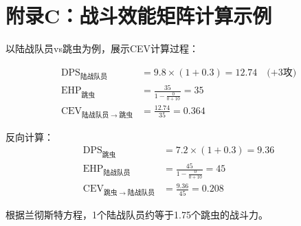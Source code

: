 \documentclass[a4paper,12pt]{article}
\begin{document}
\section{附录C：战斗效能矩阵计算示例}

以陆战队员vs跳虫为例，展示CEV计算过程：

\begin{align}
\text{DPS}_{陆战队员} &= 9.8 \times (1 + 0.3) = 12.74 \quad \text{(+3攻)} \\
\text{EHP}_{跳虫} &= \frac{35}{1 - \frac{0}{0 + 10}} = 35 \\
\text{CEV}_{陆战队员 \rightarrow 跳虫} &= \frac{12.74}{35} = 0.364
\end{align}

反向计算：
\begin{align}
\text{DPS}_{跳虫} &= 7.2 \times (1 + 0.3) = 9.36 \\
\text{EHP}_{陆战队员} &= \frac{45}{1 - \frac{0}{0 + 10}} = 45 \\
\text{CEV}_{跳虫 \rightarrow 陆战队员} &= \frac{9.36}{45} = 0.208
\end{align}

根据兰彻斯特方程，1个陆战队员约等于1.75个跳虫的战斗力。
\end{document}
